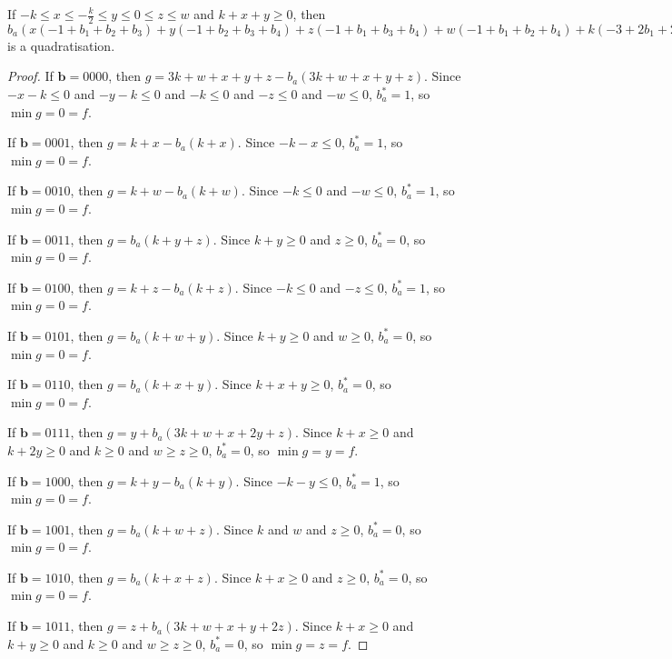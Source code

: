 \documentclass[11pt]{scrartcl}
\newcommand{\vc}[1]{\boldsymbol{#1}}
\begin{document}
\begin{lemma}
	If $-k\le x \le -\frac{k}{2} \le y \le 0 \le z \le w $ and $k + x + y \ge 0$, then $b_a(x(-1+b_1+b_2+b_3)+y(-1+b_2+b_3+b_4)+z(-1+b_1+b_3+b_4)+w(-1+b_1+b_2+b_4)+k(-3+2b_1+2b_2+2b_3+2b_4))+x(+1 -b_1-b_2-b_3+b_1b_2+b_1b_3+b_2b_3)+y(+1 -b_2-b_3-b_4+b_2b_3+b_2b_4+b_3b_4)+z(+1 -b_1-b_3-b_4+b_1b_3+b_1b_4+b_3b_4)+w(+1 -b_1-b_2-b_4+b_1b_2+b_1b_4+b_2b_4)+k(+3 -2 b_1-2 b_2-2 b_3-2 b_4+b_1b_2+b_1b_3+b_1b_4+b_2b_3+b_2b_4+b_3b_4)$ is a quadratisation.\\
 \end{lemma}

\begin{proof}
If $\vc b = 0000$, then $g = 3k + w + x + y + z - b_a(3k + w + x + y + z)$. Since $-x - k \le 0$ and $-y - k \le 0$ and $-k \le 0$ 
and $-z \le 0$ and $-w \le 0$, $b_a^* = 1$, so $\min g = 0 = f$.

If $\vc b = 0001$, then $g = k + x - b_a(k + x)$. 
Since $-k -x \le 0$, $b_a^* = 1$, so $\min g = 0 = f$.

If $\vc b = 0010$, then $g = k + w - b_a(k + w)$.
Since $-k \le 0$ and $-w \le 0$, $b_a^* = 1$, so $\min g = 0 = f$.

If $\vc b = 0011$, then $g = b_a(k + y + z)$.
Since $k + y \ge 0 $ and $z \ge 0$, $b_a^* = 0$, so $\min g = 0 = f$.

If $\vc b = 0100$, then $g = k + z - b_a(k + z)$.
Since $-k \le 0$ and $-z \le 0$, $b_a^* = 1$, so $\min g = 0 = f$.

If $\vc b = 0101$, then $g = b_a(k + w + y)$.
Since $k + y \ge 0 $ and $w \ge 0$, $b_a^* = 0 $, so $\min g = 0 = f$.

If $\vc b = 0110$, then $g = b_a(k + x + y)$. Since $k + x + y \ge 0$, $b_a^* = 0$, so $\min g = 0 = f$.

If $\vc b = 0111$, then $g = y + b_a(3k + w + x + 2y + z)$. Since $k + x \ge 0$ and $k + 2y \ge 0$ and $k \ge 0 $ and $w \ge z \ge 0$, 
$b_a^* = 0$, so $\min g = y = f$.

If $\vc b = 1000$, then $g = k + y - b_a(k + y)$. Since $-k - y \le 0$, $b_a^* = 1$, so $\min g = 0 = f$.

If $\vc b = 1001$, then $g = b_a(k + w + z)$.
Since $k$ and $w$ and $z \ge 0$, $b_a^* = 0$, so $\min g = 0 = f$.

If $\vc b = 1010$, then $g = b_a(k + x + z)$.
Since $k + x \ge 0 $ and $z \ge 0$, $b_a^* = 0$, so $\min g = 0 = f$.

If $\vc b = 1011$, then $g = z + b_a(3k + w + x + y + 2z)$.
Since $k + x \ge 0$ and $k + y \ge 0$ and $k \ge 0 $ and $w \ge z \ge 0 $, $b_a^* = 0$, so $\min g = z = f$.


\end{proof}
\end{document}
